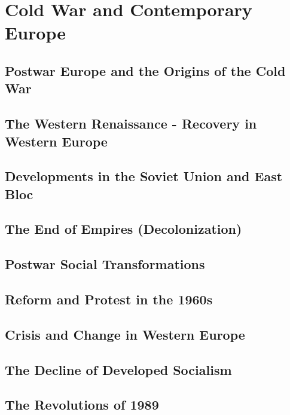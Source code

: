 \documentclass[../euro.tex]{subfiles}
\begin{document}
\chapter{Cold War and Contemporary Europe}
\section{Postwar Europe and the Origins of the Cold War}
\section{The Western Renaissance - Recovery in Western Europe}
\section{Developments in the Soviet Union and East Bloc}
\section{The End of Empires (Decolonization)}
\section{Postwar Social Transformations}
\section{Reform and Protest in the 1960s}
\section{Crisis and Change in Western Europe}
\section{The Decline of Developed Socialism}
\section{The Revolutions of 1989}
\end{document}
